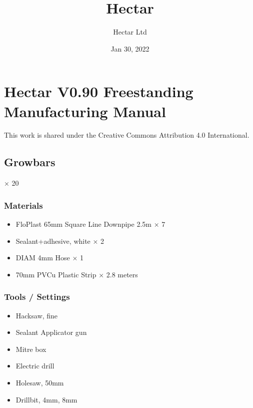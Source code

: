 \documentclass[letterpaper,10pt,english]{sphinxmanual}
\title{Hectar}
\date{Jan 30, 2022}
\author{Hectar Ltd}
\begin{document}
\pagestyle{empty}
\sphinxmaketitle
\pagestyle{plain}
\sphinxtableofcontents
\pagestyle{normal}
\label{\detokenize{index::doc}}


\noindent{}


\chapter{Hectar V0.90 Freestanding Manufacturing Manual}
\label{\detokenize{index:hectar-v0-90-freestanding-manufacturing-manual}}
This work is shared under the Creative Commons Attribution 4.0 International.


\section{Growbars}
\label{\detokenize{growbars:growbars}}\label{\detokenize{growbars::doc}}
× 20

\noindent{}


\subsection{Materials}
\label{\detokenize{growbars:materials}}\begin{itemize}
\item {} 
FloPlast 65mm Square Line Downpipe 2.5m × 7

\item {} 
Sealant+adhesive, white × 2

\item {} 
DIAM 4mm Hose × 1

\item {} 
70mm PVCu Plastic Strip × 2.8 meters

\end{itemize}


\subsection{Tools / Settings}
\label{\detokenize{growbars:tools-settings}}\begin{itemize}
\item {} 
Hacksaw, fine

\item {} 
Sealant Applicator gun

\item {} 
Mitre box

\item {} 
Electric drill

\item {} 
Holesaw, 50mm

\item {} 
Drillbit, 4mm, 8mm

\end{itemize}
\end{document}
